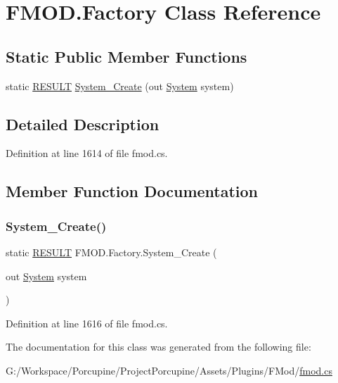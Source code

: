 \hypertarget{class_f_m_o_d_1_1_factory}{}\section{F\+M\+O\+D.\+Factory Class Reference}
\label{class_f_m_o_d_1_1_factory}
\subsection*{Static Public Member Functions}
\begin{DoxyCompactItemize}
\item 
static \hyperlink{namespace_f_m_o_d_a305d1176ef3f8c8815861a60407ac33d}{R\+E\+S\+U\+LT} \hyperlink{class_f_m_o_d_1_1_factory_a689d3b502f4e24e116c944897a8883d6}{System\+\_\+\+Create} (out \hyperlink{class_f_m_o_d_1_1_system}{System} system)
\end{DoxyCompactItemize}


\subsection{Detailed Description}


Definition at line 1614 of file fmod.\+cs.



\subsection{Member Function Documentation}
\mbox{\label{class_f_m_o_d_1_1_factory_a689d3b502f4e24e116c944897a8883d6}} 
\subsubsection{\texorpdfstring{System\+\_\+\+Create()}{System\_Create()}}
{\footnotesize\ttfamily static \hyperlink{namespace_f_m_o_d_a305d1176ef3f8c8815861a60407ac33d}{R\+E\+S\+U\+LT} F\+M\+O\+D.\+Factory.\+System\+\_\+\+Create (\begin{DoxyParamCaption}\item[{out \hyperlink{class_f_m_o_d_1_1_system}{System}}]{system }\end{DoxyParamCaption})\hspace{0.3cm}{\ttfamily [static]}}



Definition at line 1616 of file fmod.\+cs.



The documentation for this class was generated from the following file\+:\begin{DoxyCompactItemize}
\item 
G\+:/\+Workspace/\+Porcupine/\+Project\+Porcupine/\+Assets/\+Plugins/\+F\+Mod/\hyperlink{fmod_8cs}{fmod.\+cs}\end{DoxyCompactItemize}
